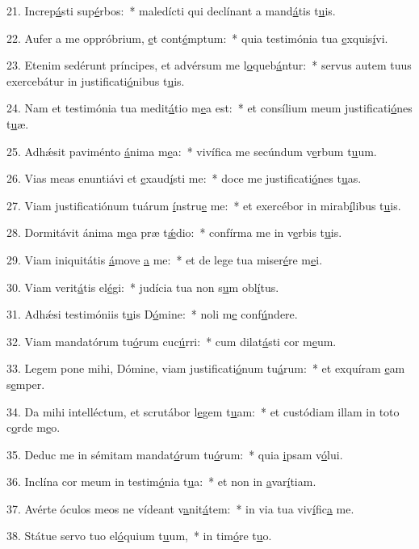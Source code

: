21. Increp\uline{á}sti sup\uline{é}rbos:~* maledícti qui declínant a mand\uline{á}tis t\uline{u}is.\par 
22. Aufer a me oppróbrium, \uline{e}t cont\uline{é}mptum:~* quia testimónia tua \uline{e}xquis\uline{í}vi.\par 
23. Etenim sedérunt príncipes, et advérsum me l\uline{o}queb\uline{á}ntur:~* servus autem tuus exercebátur in justificati\uline{ó}nibus t\uline{u}is.\par 
24. Nam et testimónia tua medit\uline{á}tio m\uline{e}a est:~* et consílium meum justificati\uline{ó}nes t\uline{u}æ.\par 
25. Adhǽsit paviménto \uline{á}nima m\uline{e}a:~* vivífica me secúndum v\uline{e}rbum t\uline{u}um.\par 
26. Vias meas enuntiávi et \uline{e}xaud\uline{í}sti me:~* doce me justificati\uline{ó}nes t\uline{u}as.\par 
27. Viam justificatiónum tuárum \uline{í}nstru\uline{e} me:~* et exercébor in mirab\uline{í}libus t\uline{u}is.\par 
28. Dormitávit ánima m\uline{e}a præ t\uline{ǽ}dio:~* confírma me in v\uline{e}rbis t\uline{u}is.\par 
29. Viam iniquitátis \uline{á}move \uline{a} me:~* et de lege tua miser\uline{é}re m\uline{e}i.\par 
30. Viam verit\uline{á}tis el\uline{é}gi:~* judícia tua non s\uline{u}m obl\uline{í}tus.\par 
31. Adhǽsi testimóniis t\uline{u}is D\uline{ó}mine:~* noli m\uline{e} conf\uline{ú}ndere.\par 
32. Viam mandatórum tu\uline{ó}rum cuc\uline{ú}rri:~* cum dilat\uline{á}sti cor m\uline{e}um.\par 
33. Legem pone mihi, Dómine, viam justificati\uline{ó}num tu\uline{á}rum:~* et exquíram \uline{e}am s\uline{e}mper.\par 
34. Da mihi intelléctum, et scrutábor l\uline{e}gem t\uline{u}am:~* et custódiam illam in toto c\uline{o}rde m\uline{e}o.\par 
35. Deduc me in sémitam mandat\uline{ó}rum tu\uline{ó}rum:~* quia \uline{i}psam v\uline{ó}lui.\par 
36. Inclína cor meum in testim\uline{ó}nia t\uline{u}a:~* et non in \uline{a}var\uline{í}tiam.\par 
37. Avérte óculos meos ne vídeant v\uline{a}nit\uline{á}tem:~* in via tua viv\uline{í}fic\uline{a} me.\par 
38. Státue servo tuo el\uline{ó}quium t\uline{u}um,~* in tim\uline{ó}re t\uline{u}o.\par 
